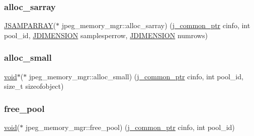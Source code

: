 \mbox{\label{structjpeg__memory__mgr_a08372f39a3b7a2f48f0f27d6d8f6a2c3}} 
\subsubsection{\texorpdfstring{alloc\+\_\+sarray}{alloc\_sarray}}
{\footnotesize\ttfamily \hyperlink{jpeglib_8h_ac9d5d1b829ed51769db69a37271a7e91}{J\+S\+A\+M\+P\+A\+R\+R\+AY}($\ast$ jpeg\+\_\+memory\+\_\+mgr\+::alloc\+\_\+sarray) (\hyperlink{jpeglib_8h_a1a177ab705cefea8f30ec31a48e62650}{j\+\_\+common\+\_\+ptr} cinfo, int pool\+\_\+id, \hyperlink{jmorecfg_8h_a04ed4674f6f1d0d50ec241531e38274f}{J\+D\+I\+M\+E\+N\+S\+I\+ON} samplesperrow, \hyperlink{jmorecfg_8h_a04ed4674f6f1d0d50ec241531e38274f}{J\+D\+I\+M\+E\+N\+S\+I\+ON} numrows)}

\mbox{\label{structjpeg__memory__mgr_a682e2af140b98c505bf4a2310c59361b}} 
\subsubsection{\texorpdfstring{alloc\+\_\+small}{alloc\_small}}
{\footnotesize\ttfamily \hyperlink{png_8h_ac9c84fa68bbad002983e35ce3663c686}{void}$\ast$($\ast$ jpeg\+\_\+memory\+\_\+mgr\+::alloc\+\_\+small) (\hyperlink{jpeglib_8h_a1a177ab705cefea8f30ec31a48e62650}{j\+\_\+common\+\_\+ptr} cinfo, int pool\+\_\+id, size\+\_\+t sizeofobject)}

\mbox{\label{structjpeg__memory__mgr_a3fc57722021d2e656e5e63e6e3e6e45b}} 
\subsubsection{\texorpdfstring{free\+\_\+pool}{free\_pool}}
{\footnotesize\ttfamily \hyperlink{png_8h_ac9c84fa68bbad002983e35ce3663c686}{void}($\ast$ jpeg\+\_\+memory\+\_\+mgr\+::free\+\_\+pool) (\hyperlink{jpeglib_8h_a1a177ab705cefea8f30ec31a48e62650}{j\+\_\+common\+\_\+ptr} cinfo, int pool\+\_\+id)}

